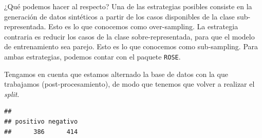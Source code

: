 \documentclass[
]{book}
\newenvironment{Shaded}{\begin{snugshade}}{\end{snugshade}}
\newcommand{\AttributeTok}[1]{\textcolor[rgb]{0.77,0.63,0.00}{#1}}
\newcommand{\CommentTok}[1]{\textcolor[rgb]{0.56,0.35,0.01}{\textit{#1}}}
\newcommand{\DecValTok}[1]{\textcolor[rgb]{0.00,0.00,0.81}{#1}}
\newcommand{\FloatTok}[1]{\textcolor[rgb]{0.00,0.00,0.81}{#1}}
\newcommand{\FunctionTok}[1]{\textcolor[rgb]{0.00,0.00,0.00}{#1}}
\newcommand{\NormalTok}[1]{#1}
\newcommand{\OtherTok}[1]{\textcolor[rgb]{0.56,0.35,0.01}{#1}}
\newcommand{\SpecialCharTok}[1]{\textcolor[rgb]{0.00,0.00,0.00}{#1}}
\newcommand{\StringTok}[1]{\textcolor[rgb]{0.31,0.60,0.02}{#1}}
\begin{document}
¿Qué podemos hacer al respecto? Una de las estrategias posibles consiste en la generación de datos sintéticos a partir de los casos disponibles de la clase sub-representada. Esto es lo que conocemos como over-sampling. La estrategia contraria es reducir los casos de la clase sobre-representada, para que el modelo de entrenamiento sea parejo. Esto es lo que conocemos como sub-sampling. Para ambas estrategias, podemos contar con el paquete \texttt{ROSE}.

Tengamos en cuenta que estamos alternado la base de datos con la que trabajamos (post-procesamiento), de modo que tenemos que volver a realizar el \emph{split}.

\begin{Shaded}
\end{Shaded}

\begin{verbatim}
## 
## positivo negativo 
##      386      414
\end{verbatim}
\end{document}
